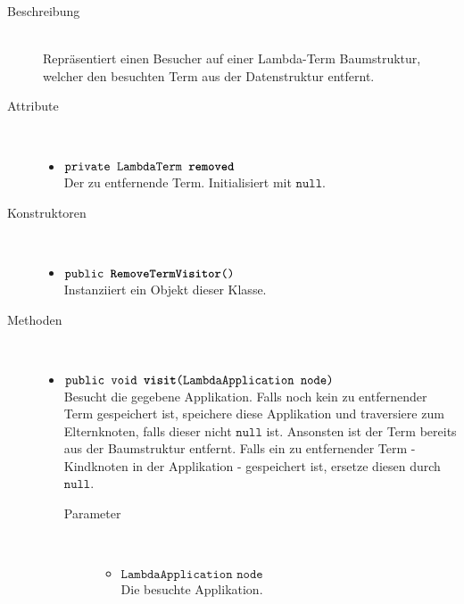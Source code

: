 \begin{description}
\item[Beschreibung] \hfill \\ Repräsentiert einen Besucher auf einer Lambda-Term Baumstruktur, welcher den besuchten Term aus der Datenstruktur entfernt.

\item[Attribute] \hfill \\
	\vspace{-.8cm}
	\begin{itemize}
		\item $\texttt{private LambdaTerm \textbf{removed}}$ \\ Der zu entfernende Term. Initialisiert mit $\texttt{null}$.
	\end{itemize}

\item[Konstruktoren] \hfill \\
	\vspace{-.8cm}
	\begin{itemize}
		\item $\texttt{public \textbf{RemoveTermVisitor}()}$ \\ Instanziiert ein Objekt dieser Klasse.
	\end{itemize}

\item[Methoden] \hfill \\
	\vspace{-.8cm}
	\begin{itemize}
		\item $\texttt{public void \textbf{visit}(LambdaApplication node)}$ \\ Besucht die gegebene Applikation. Falls noch kein zu entfernender Term gespeichert ist, speichere diese Applikation und traversiere zum Elternknoten, falls dieser nicht $\texttt{null}$ ist. Ansonsten ist der Term bereits aus der Baumstruktur entfernt. Falls ein zu entfernender Term - Kindknoten in der Applikation - gespeichert ist, ersetze diesen durch $\texttt{null}$.
		\begin{description}
			\item[Parameter] \hfill \\
			\vspace{-.8cm}
			\begin{itemize}
				\item $\texttt{LambdaApplication node}$ \\ Die besuchte Applikation.
			\end{itemize}
		\end{description}
		

\end{itemize}
\end{description}
